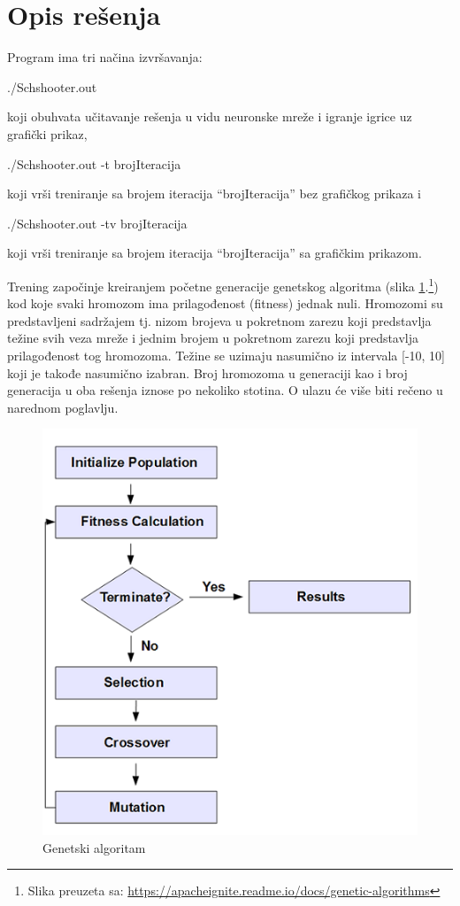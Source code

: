 \documentclass[a4paper]{article}
\begin{document}
\section{Opis rešenja}
\label{sec:opisResenja}
\par Program ima tri načina izvršavanja:
\begin{tcolorbox}
./Schshooter.out
\end{tcolorbox}
koji obuhvata učitavanje rešenja u vidu neuronske mreže i igranje igrice uz grafički prikaz,
\begin{tcolorbox}
./Schshooter.out -t brojIteracija
\end{tcolorbox}
koji vrši treniranje sa brojem iteracija “brojIteracija” bez grafičkog prikaza i
\begin{tcolorbox}
./Schshooter.out -tv brojIteracija
\end{tcolorbox}
koji vrši treniranje sa brojem iteracija “brojIteracija”  sa grafičkim prikazom.

\newpage
\par Trening započinje kreiranjem početne generacije genetskog algoritma\cite{genetic} (slika \ref{fig:genetic}.\footnote{Slika preuzeta sa: \url{https://apacheignite.readme.io/docs/genetic-algorithms}}) kod koje svaki hromozom ima prilagođenost (fitness) jednak nuli. Hromozomi su predstavljeni sadržajem tj. nizom brojeva u pokretnom zarezu koji predstavlja težine svih veza mreže i jednim brojem u pokretnom zarezu koji predstavlja prilagođenost tog hromozoma. Težine se uzimaju nasumično iz intervala [-10, 10] koji je takođe nasumično izabran. Broj hromozoma u generaciji kao i broj generacija u oba rešenja iznose po nekoliko stotina. O ulazu će više biti rečeno u narednom poglavlju.

\begin{figure}[h!]
	\begin{center}
		\includegraphics[scale=0.7]{genetic.png}
	\end{center}
	\caption{Genetski algoritam}
	\label{fig:genetic}
\end{figure}
\end{document}
